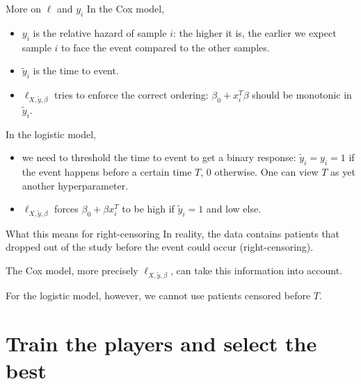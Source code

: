 \documentclass[10pt, aspectratio=169]{beamer}
\begin{document}
\begin{frame}{More on $\ell$ and $y_i$}
  In the \alert{Cox} model,
  \begin{itemize}
    \item $y_i$ is the \alert{relative hazard} of sample $i$: the higher it is, the earlier we 
      expect sample $i$ to face the event compared to the other samples.
    \item $\tilde{y}_i$ is the time to event.
    \item $\ell_{X, \tilde{y}, \beta}$ tries to enforce the correct ordering: $\beta_0 + x_i^T \beta$ 
      should be monotonic in $\tilde{y}_i$.
  \end{itemize}

  In the \alert{logistic} model,
  \begin{itemize}
    \item we need to \alert{threshold the time to event} to get a \alert{binary response}: 
      $\tilde{y}_i = y_i = 1$ if the event happens before a certain time $T$, $0$ otherwise. 
      One can view \alert{$T$} as yet \alert{another hyperparameter}.
    \item $\ell_{X, \tilde{y}, \beta}$ forces $\beta_0 + \beta x_i^T$ to be high if 
      $\tilde{y}_i = 1$ and low else.
  \end{itemize}
\end{frame}

\begin{frame}{What this means for right-censoring}
  In reality, the data contains patients that dropped out of the study before the event could 
  occur (right-censoring).

  The Cox model, more precisely $\ell_{X, \tilde{y}, \beta}$, can take this information into 
  account.

  For the logistic model, however, we cannot use patients censored before $T$.
\end{frame}

\section{Train the players and select the best}
\end{document}
